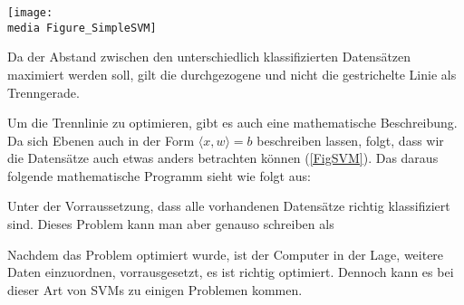 \begin{dsafigure}
	\begin{center}
		\texttt{[image: \\media Figure\_SimpleSVM]}
		\caption{Da der Abstand zwischen den unterschiedlich klassifizierten Datensätzen maximiert werden soll, gilt die durchgezogene und nicht die gestrichelte Linie als Trenngerade.}
		\label{FigSimpleSVM}
	\end{center}
\end{dsafigure}

Um die Trennlinie zu optimieren, gibt es auch eine mathematische Beschreibung. Da sich Ebenen auch in der Form $\langle x, w \rangle = b $ beschreiben lassen, folgt, dass wir die Datensätze auch etwas anders betrachten können (\ref{FigSVM}).
Das daraus folgende mathematische Programm sieht wie folgt aus: 


Unter der Vorraussetzung, dass alle vorhandenen Datensätze richtig klassifiziert sind. Dieses Problem kann 
man aber genauso schreiben als 

%

Nachdem das Problem optimiert wurde, ist der Computer in der Lage, weitere Daten einzuordnen, vorrausgesetzt, es ist richtig optimiert.
Dennoch kann es bei dieser Art von SVMs zu einigen Problemen kommen.\\

